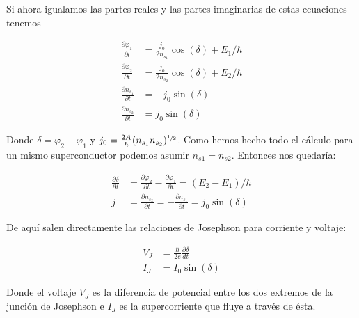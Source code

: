 Si ahora igualamos las partes reales y las partes imaginarias de estas ecuaciones tenemos

\begin{align}
    \frac{\partial \varphi_1}{\partial t} &= \frac{j_0}{2 n_{s_1}} \cos(\delta) + E_1/\hbar \\
    \frac{\partial \varphi_2}{\partial t} &= \frac{j_0}{2 n_{s_2}} \cos(\delta) + E_2/\hbar \\
    \frac{\partial n_{s_1}}{\partial t} &= -j_0 \sin(\delta) \\
    \frac{\partial n_{s_2}}{\partial t} &= j_0 \sin(\delta)
\end{align}

Donde $\delta = \varphi_2 - \varphi_1$ y $j_0 = \frac{2 A}{\hbar} (n_{s_1} n_{s_2})^{\sfrac{1}{2}}$. Como hemos hecho todo el cálculo para un mismo superconductor podemos asumir $n_{s1} = n_{s2}$. Entonces nos quedaría:

\begin{align}
    \frac{\partial \delta}{\partial t} &= \frac{\partial \varphi_2}{\partial t} - \frac{\partial \varphi_1}{\partial t} = (E_2 - E_1)/\hbar \\
    j &= \frac{\partial n_{s_2}}{\partial t} = - \frac{\partial n_{s_1}}{\partial t} = j_0 \sin(\delta)
\end{align}

De aquí salen directamente las relaciones de Josephson para corriente y voltaje:

\begin{align}
    V_J &= \frac{\hbar}{2e} \frac{\partial \delta}{d t} \\
    I_J &= I_0 \sin(\delta)
\end{align}

Donde el voltaje $V_J$ es la diferencia de potencial entre los dos extremos de la junción de Josephson e $I_J$ es la supercorriente que fluye a través de ésta.

